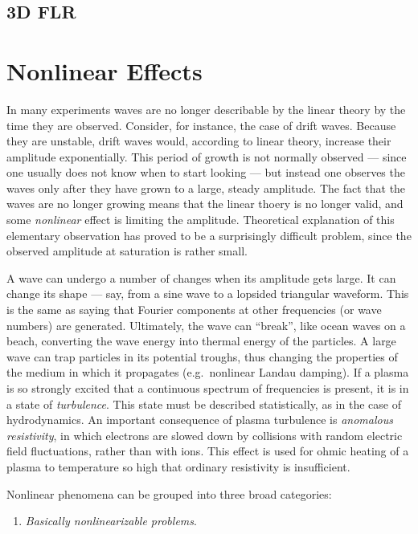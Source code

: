 \documentclass[
  notoc %
]{tufte-book}
\providecommand{\tightlist}{%
  \setlength{\itemsep}{0pt}\setlength{\parskip}{0pt}
}
\begin{document}
\hypertarget{d-flr}{%
\section{3D FLR}\label{d-flr}}

\hypertarget{sec:nonlinear}{%
\chapter{Nonlinear Effects}\label{sec:nonlinear}}

In many experiments waves are no longer describable by the linear theory
by the time they are observed. Consider, for instance, the case of drift
waves. Because they are unstable, drift waves would, according to linear
theory, increase their amplitude exponentially. This period of growth is
not normally observed --- since one usually does not know when to start
looking --- but instead one observes the waves only after they have
grown to a large, steady amplitude. The fact that the waves are no
longer growing means that the linear thoery is no longer valid, and some
\emph{nonlinear} effect is limiting the amplitude. Theoretical
explanation of this elementary observation has proved to be a
surprisingly difficult problem, since the observed amplitude at
saturation is rather small.

A wave can undergo a number of changes when its amplitude gets large. It
can change its shape --- say, from a sine wave to a lopsided triangular
waveform. This is the same as saying that Fourier components at other
frequencies (or wave numbers) are generated. Ultimately, the wave can
``break'', like ocean waves on a beach, converting the wave energy into
thermal energy of the particles. A large wave can trap particles in its
potential troughs, thus changing the properties of the medium in which
it propagates (e.g.~nonlinear Landau damping). If a plasma is so
strongly excited that a continuous spectrum of frequencies is present,
it is in a state of \emph{turbulence}. This state must be described
statistically, as in the case of hydrodynamics. An important consequence
of plasma turbulence is \emph{anomalous resistivity}, in which electrons
are slowed down by collisions with random electric field fluctuations,
rather than with ions. This effect is used for ohmic heating of a plasma
to temperature so high that ordinary resistivity is insufficient.

Nonlinear phenomena can be grouped into three broad categories:

\begin{enumerate}
\def\labelenumi{\arabic{enumi}.}
\tightlist
\item
  \emph{Basically nonlinearizable problems}.
\end{enumerate}
\end{document}

